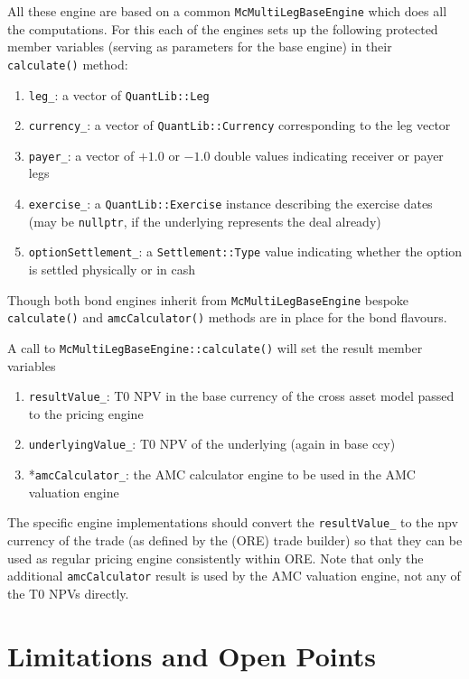 \documentclass[12pt, a4paper]{article}
\begin{document}
All these engine are based on a common \verb+McMultiLegBaseEngine+ which does all the computations. For this each of the
engines sets up the following protected member variables (serving as parameters for the base engine) in their
\verb+calculate()+ method:

\begin{enumerate}
\item \verb+leg_+: a vector of \verb+QuantLib::Leg+
\item \verb+currency_+: a vector of \verb+QuantLib::Currency+ corresponding to the leg vector
\item \verb+payer_+: a vector of $+1.0$ or $-1.0$ double values indicating receiver or payer legs
\item \verb+exercise_+: a \verb+QuantLib::Exercise+ instance describing the exercise dates (may be \verb+nullptr+, if
  the underlying represents the deal already)
\item \verb+optionSettlement_+: a \verb+Settlement::Type+ value indicating whether the option is settled physically or
  in cash
\end{enumerate}

Though both bond engines inherit from \verb+McMultiLegBaseEngine+ bespoke \verb+calculate()+ and \verb+amcCalculator()+
methods are in place for the bond flavours.

A call to \verb+McMultiLegBaseEngine::calculate()+ will set the result member variables

\begin{enumerate}
\item \verb+resultValue_+: T0 NPV in the base currency of the cross asset model passed to the pricing engine
\item \verb+underlyingValue_+: T0 NPV of the underlying (again in base ccy)
\item *\verb+amcCalculator_+: the AMC calculator engine to be used in the AMC valuation engine
\end{enumerate}

The specific engine implementations should convert the \verb+resultValue_+ to the npv currency of the trade (as defined
by the (ORE) trade builder) so that they can be used as regular pricing engine consistently within ORE. Note that only
the additional \verb+amcCalculator+ result is used by the AMC valuation engine, not any of the T0 NPVs directly.

\section{Limitations and Open Points}
\end{document}
